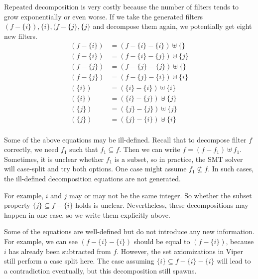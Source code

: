 \documentclass[msc,oneside]{ubcthesis}
\begin{document}
Repeated decomposition is very costly because the number of filters tends to grow exponentially or even worse. If we take the generated filters $(f - \{i\}), \{i\},  ( f - \{j\},  \{j\}$ and decompose them again, we potentially get eight new filters.
\begin{align*} 
\left( f - \{i\}\right) &= 
        \left( f - \{i\} - \{i\}\right) \uplus \{\} \\
\left( f - \{i\}\right) &= 
        \left( f - \{i\} - \{j\}\right) \uplus \{j\} \\
\left( f - \{j\}\right) &= 
        \left( f - \{j\} - \{j\}\right) \uplus \{\} \\
\left( f - \{j\}\right) &= 
        \left( f - \{j\} - \{i\}\right) \uplus \{i\} \\
\left(\{i\}\right) &= 
        \left(\{i\} - \{i\}\right) \uplus \{i\} \\
\left(\{i\}\right) &= 
        \left(\{i\} - \{j\}\right) \uplus \{j\} \\
\left(\{j\}\right) &= 
        \left(\{j\} - \{j\}\right) \uplus \{j\} \\
\left(\{j\}\right) &= 
        \left(\{j\} - \{i\}\right) \uplus \{i\} \\
\end{align*}

Some of the above equations may be ill-defined. Recall that to decompose filter $f$ correctly, we need $f_1$ such that $f_1 \subseteq f$. Then we can write $f = (f - f_1) \uplus f_1.$ Sometimes, it is unclear whether $f_1$ is a subset, so in practice, the SMT solver will case-split and try both options. One case might assume $f_1 \not\subseteq f$. In such cases, the ill-defined decomposition equations are not generated. 

For example, $i$ and $j$ may or may not be the same integer. So whether the subset property $\{j\} \subseteq f - \{i\}$ holds is unclear. Nevertheless, these decompositions may happen in one case, so we write them explicitly above.

Some of the equations are well-defined but do not introduce any new information. For example, we can see $\left( f - \{i\} - \{i\}\right)$ should be equal to $\left( f - \{i\}\right)$, because $i$ has already been subtracted from $f$. However, the set axiomizations in Viper still perform a case split here. The case assuming $\{i\} \subseteq f - \{i\} - \{i\}$ will lead to a contradiction eventually, but this decomposition still spawns. 
\end{document}
